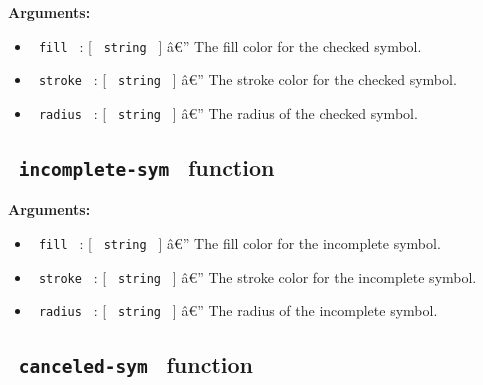\begin{Shaded}
\begin{Highlighting}[]
\end{Highlighting}
\end{Shaded}

\textbf{Arguments:}

\begin{itemize}
\tightlist
\item
  \texttt{\ fill\ } : {[} \texttt{\ string\ } {]} â€'' The fill color
  for the checked symbol.
\item
  \texttt{\ stroke\ } : {[} \texttt{\ string\ } {]} â€'' The stroke
  color for the checked symbol.
\item
  \texttt{\ radius\ } : {[} \texttt{\ string\ } {]} â€'' The radius of
  the checked symbol.
\end{itemize}

\subsection{\texorpdfstring{\texttt{\ incomplete-sym\ }
function}{ incomplete-sym  function}}\label{incomplete-sym-function}

\begin{Shaded}
\begin{Highlighting}[]
\end{Highlighting}
\end{Shaded}

\textbf{Arguments:}

\begin{itemize}
\tightlist
\item
  \texttt{\ fill\ } : {[} \texttt{\ string\ } {]} â€'' The fill color
  for the incomplete symbol.
\item
  \texttt{\ stroke\ } : {[} \texttt{\ string\ } {]} â€'' The stroke
  color for the incomplete symbol.
\item
  \texttt{\ radius\ } : {[} \texttt{\ string\ } {]} â€'' The radius of
  the incomplete symbol.
\end{itemize}

\subsection{\texorpdfstring{\texttt{\ canceled-sym\ }
function}{ canceled-sym  function}}\label{canceled-sym-function}


